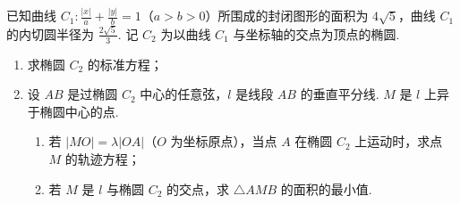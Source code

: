 \begin{problem}
已知曲线 \(C_1: \frac{|x|}{a} + \frac{|y|}{b} = 1\)（\(a > b > 0\)）所围成的封闭图形的面积为 \(4\sqrt{5}\)，曲线 \(C_1\) 的内切圆半径为 \(\frac{2\sqrt{5}}{3}\). 记 \(C_2\) 为以曲线 \(C_1\) 与坐标轴的交点为顶点的椭圆.
\begin{enumerate}
\item 求椭圆 \(C_{2}\) 的标准方程；
\item 设 \(AB\) 是过椭圆 \(C_{2}\) 中心的任意弦，\(l\) 是线段 \(AB\) 的垂直平分线. \(M\) 是 \(l\) 上异于椭圆中心的点.
\begin{enumerate}
\item 若 \( |MO| = \lambda |OA| \)（\(O\) 为坐标原点），当点 \(A\) 在椭圆 \(C_2\) 上运动时，求点 \(M\) 的轨迹方程；
\item 若 \(M\) 是 \(l\) 与椭圆 \(C_2\) 的交点，求 \(\triangle AMB\) 的面积的最小值.
\end{enumerate}
\end{enumerate}
\end{problem}

